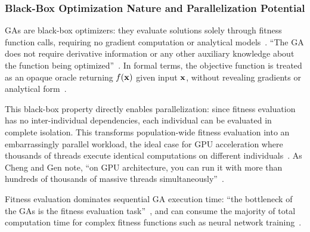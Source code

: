 \documentclass[a4paper,14pt]{extarticle}
\begin{document}
\subsubsection*{Black-Box Optimization Nature and Parallelization Potential}

GAs are black-box optimizers: they evaluate solutions solely through fitness function calls, requiring no gradient computation or analytical models~\cite{katoch2021review}. ``The GA does not require derivative information or any other auxiliary knowledge about the function being optimized''~\cite{mitchell1998introduction}. In formal terms, the objective function is treated as an opaque oracle returning $f(\mathbf{x})$ given input $\mathbf{x}$, without revealing gradients or analytical form~\cite{audet2017derivative,nocedal2006numerical}.

This black-box property directly enables parallelization: since fitness evaluation has no inter-individual dependencies, each individual can be evaluated in complete isolation. This transforms population-wide fitness evaluation into an embarrassingly parallel workload, the ideal case for GPU acceleration where thousands of threads execute identical computations on different individuals~\cite{cheng2020parallel}. As Cheng and Gen note, ``on GPU architecture, you can run it with more than hundreds of thousands of massive threads simultaneously''~\cite{cheng2020parallel}.

Fitness evaluation dominates sequential GA execution time: ``the bottleneck of the GAs is the fitness evaluation task''~\cite{salami2002fitness}, and can consume the majority of total computation time for complex fitness functions such as neural network training~\cite{salami2002fitness}.
\end{document}
